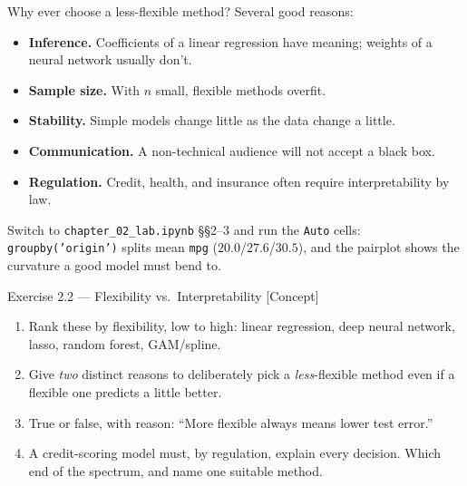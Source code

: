 \documentclass[aspectratio=169,11pt]{beamer}
\begin{document}
\begin{frame}{Why ever choose a less-flexible method?}\label{frm:lessflex}
  Several good reasons:
  \begin{takeaway}
    \begin{itemize}
      \item \textbf{Inference.} Coefficients of a linear regression
            have meaning; weights of a neural network usually don't.
      \item \textbf{Sample size.} With $n$ small, flexible methods
            overfit.
      \item \textbf{Stability.} Simple models change little as the
            data change a little.
      \item \textbf{Communication.} A non-technical audience will not
            accept a black box.
      \item \textbf{Regulation.} Credit, health, and insurance often
            require interpretability by law.
    \end{itemize}
  \end{takeaway}
  \begin{labnote}
    Switch to \texttt{chapter\_02\_lab.ipynb} \S\S2--3 and run the \texttt{Auto} cells:
    \texttt{groupby('origin')} splits mean \texttt{mpg} ($20.0$/$27.6$/$30.5$), and the pairplot shows the curvature a good model must bend to.
  \end{labnote}
\end{frame}


\begin{frame}{Exercise 2.2 --- Flexibility vs.\ Interpretability [Concept]}
\begin{exercise}
\begin{enumerate}
  \item Rank these by flexibility, low to high: linear regression,
        deep neural network, lasso, random forest, GAM/spline.
  \item Give \emph{two} distinct reasons to deliberately pick a
        \emph{less}-flexible method even if a flexible one predicts a
        little better.
  \item True or false, with reason: ``More flexible always means
        lower test error.''
  \item A credit-scoring model must, by regulation, explain every
        decision. Which end of the spectrum, and name one suitable
        method.
\end{enumerate}
\end{exercise}
\end{frame}
\end{document}
